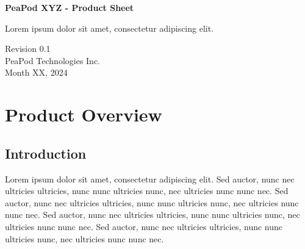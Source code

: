 \documentclass{../../../../docs/tex/report}
\begin{document}
\begin{titlepage}
    \begin{center}
        \vspace*{1.2cm}

        \textbf{\large{PeaPod XYZ - Product Sheet}}

        \vspace{0.5cm}

        Lorem ipsum dolor sit amet, consectetur adipiscing elit.

        \vfill
        
        \vspace{1.25cm}

        Revision 0.1\\
        PeaPod Technologies Inc.\\
        Month XX, 2024

    \end{center}
\end{titlepage}

\thispagestyle{plain}

\tableofcontents
\clearpage

\section{Product Overview}

\subsection{Introduction}

Lorem ipsum dolor sit amet, consectetur adipiscing elit. Sed auctor, nunc nec ultricies ultricies, nunc nunc ultricies nunc, nec ultricies nunc nunc nec. Sed auctor, nunc nec ultricies ultricies, nunc nunc ultricies nunc, nec ultricies nunc nunc nec. Sed auctor, nunc nec ultricies ultricies, nunc nunc ultricies nunc, nec ultricies nunc nunc nec. Sed auctor, nunc nec ultricies ultricies, nunc nunc ultricies nunc, nec ultricies nunc nunc nec.

\clearpage



\end{document}
